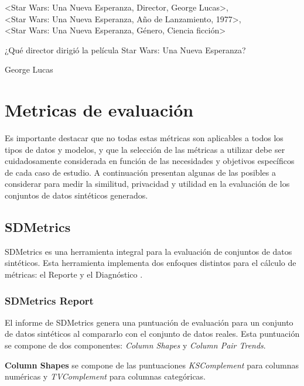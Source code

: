 \begin{tcolorbox}[colback=white,colframe=black!50!white,title=Input]
<Star Wars: Una Nueva Esperanza, Director, George Lucas>, \\
<Star Wars: Una Nueva Esperanza, Año de Lanzamiento, 1977>, \\
<Star Wars: Una Nueva Esperanza, Género, Ciencia ficción>
\end{tcolorbox}
\begin{tcolorbox}[colback=white,colframe=black!50!white,title=Pregunta]
¿Qué director dirigió la película Star Wars: Una Nueva Esperanza?
\end{tcolorbox}
\begin{tcolorbox}[colback=white,colframe=black!50!white,title=Respuesta esperada]
George Lucas
\end{tcolorbox}

\newpage
\section{Metricas de evaluación}
Es importante destacar que no todas estas métricas son aplicables a todos los tipos de datos y modelos, y que la selección de las métricas a utilizar debe ser cuidadosamente considerada en función de las necesidades y objetivos específicos de cada caso de estudio.
A continuación presentan algunas de las posibles a considerar para medir la similitud, privacidad y utilidad en la evaluación de los conjuntos de datos sintéticos generados.

\subsection{SDMetrics}
SDMetrics es una herramienta integral para la evaluación de conjuntos de datos sintéticos. Esta herramienta implementa dos enfoques distintos para el cálculo de métricas: el Reporte y el Diagnóstico \cite{noauthor_sdmetrics_nodate}.


\subsubsection{SDMetrics Report}

El informe de SDMetrics genera una puntuación de evaluación para un conjunto de datos sintéticos al compararlo con el conjunto de datos reales. Esta puntuación se compone de dos componentes: \emph{Column Shapes} y \emph{Column Pair Trends}.

\textbf{Column Shapes} se compone de las puntuaciones \emph{KSComplement} para columnas numéricas y \emph{TVComplement} para columnas categóricas.

